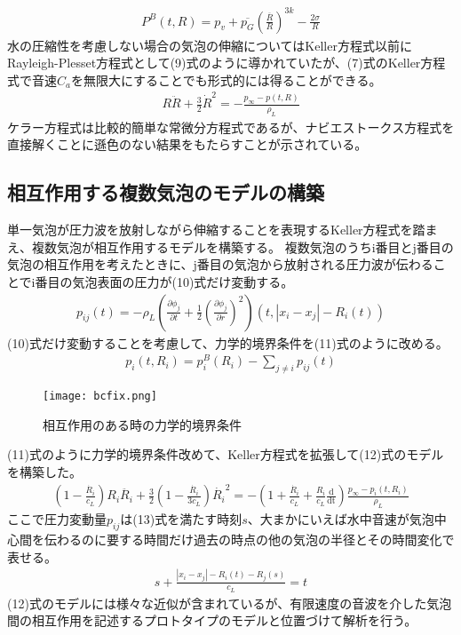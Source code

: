 \documentclass[11pt,a4j]{jreport}
\begin{document}
\begin{align}
P^{B}(t,R)=p_{v} + \overline{p_{G}}\left(\frac{\overline{R}}{R}\right)^{3k}-\frac{2\sigma}{R}\tag{8}
\end{align}
%
水の圧縮性を考慮しない場合の気泡の伸縮についてはKeller方程式以前にRayleigh-Plesset方程式として(9)式のように導かれていたが、(7)式のKeller方程式で音速$C_{a}$を無限大にすることでも形式的には得ることができる。
\begin{align}
R\ddot{R}+\frac{3}{2}\dot{R}^2 = -\frac{p_{∞}-p(t, R)}{\rho_{L}}\tag{9}
\end{align}
%
ケラー方程式は比較的簡単な常微分方程式であるが、ナビエストークス方程式を直接解くことに遜色のない結果をもたらすことが示されている。

\subsection{相互作用する複数気泡のモデルの構築}
単一気泡が圧力波を放射しながら伸縮することを表現するKeller方程式を踏まえ、複数気泡が相互作用するモデルを構築する。
複数気泡のうちi番目とj番目の気泡の相互作用を考えたときに、j番目の気泡から放射される圧力波が伝わることでi番目の気泡表面の圧力が(10)式だけ変動する。
\begin{align}
p_{ij}(t)=-\rho_{L}(\frac{\partial \phi_{j}}{\partial t}+\frac{1}{2}\left(\frac{\partial \phi_{j}}{\partial r}\right)^2)(t,|x_{i}-x_{j}|-R_{i}(t))\tag{10}
\end{align}
%
(10)式だけ変動することを考慮して、力学的境界条件を(11)式のように改める。
\begin{align}
p_{i}(t,R_{i})=p_{i}^B(R_{i})-\sum_{j\neq i}p_{ij}(t)\tag{11}
\end{align}
%
\begin{figure}[tbh]
\centering
\texttt{[image: bcfix.png]}
\caption{相互作用のある時の力学的境界条件}
\label{fig:bcfix}
\end{figure}
%

(11)式のように力学的境界条件改めて、Keller方程式を拡張して(12)式のモデルを構築した。
\begin{align}
\left(1-\frac{\dot{R_{i}}}{c_{L}}\right)R_{i}\ddot{R_{i}}+\frac{3}{2}\left(1-\frac{\dot{R_{i}}}{3c_{L}}\right)\dot{R_{i}}^2 = -\left(1+\frac{\dot{R_{i}}}{c_{L}}+\frac{R_{i}}{c_{L}}\frac{\text{d}}{\text{dt}}\right)\frac{p_{∞}-p_i(t, R_{i})}{\rho_{L}}\tag{12}
\end{align}
%
ここで圧力変動量$p_{ij}$は(13)式を満たす時刻$s$、大まかにいえば水中音速が気泡中心間を伝わるのに要する時間だけ過去の時点の他の気泡の半径とその時間変化で表せる。\\
\begin{align}
s+\frac{|x_{i}-x_{j}|-R_{i}(t)-R_{j}(s)}{c_{L}}=t\tag{13}
\end{align}
%
(12)式のモデルには様々な近似が含まれているが、有限速度の音波を介した気泡間の相互作用を記述するプロトタイプのモデルと位置づけて解析を行う。
\end{document}
